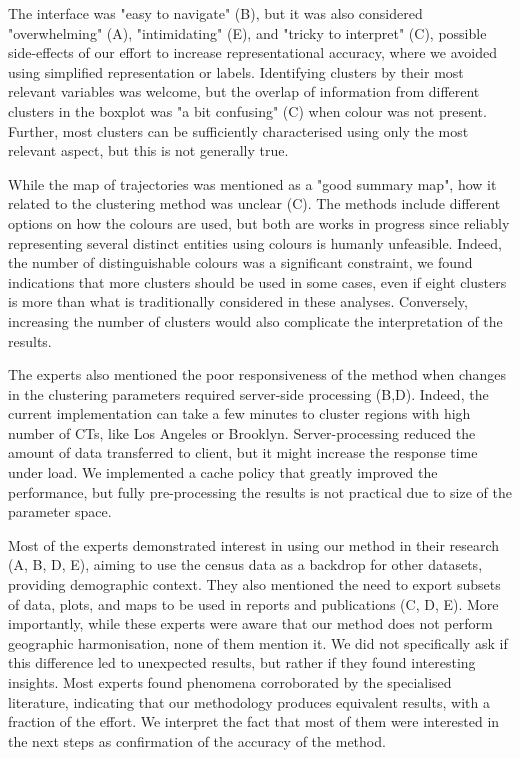 The interface was "easy to navigate" (B), but it was also considered
"overwhelming" (A), "intimidating" (E), and "tricky to interpret" (C), possible
side-effects of our effort to increase  representational accuracy, where we
avoided using simplified representation or labels. Identifying clusters by their
most relevant variables was welcome, but the overlap of information from
different clusters in the boxplot was "a bit confusing" (C) when colour was not
present. Further, most clusters can be sufficiently characterised using only the
most relevant aspect, but this is not generally true. 


While the map of trajectories was mentioned as a "good summary map", how it
related to the clustering method was unclear (C). The methods include different
options on how the colours are used, but both are works in progress since reliably
representing several distinct entities using colours is humanly unfeasible.
Indeed, the number of distinguishable colours was a significant constraint, we
found indications that more clusters should be used in some cases, even if eight
clusters is more than what is traditionally considered in these analyses.
Conversely, increasing the number of clusters would also complicate the
interpretation of the results.


The experts also mentioned the poor responsiveness of the method when changes in
the clustering parameters required server-side processing (B,D). Indeed, the
current implementation can take a few minutes to cluster regions with high
number of CTs, like Los Angeles or Brooklyn. Server-processing reduced the
amount of data transferred to client, but it might increase the response time
under load. We implemented a cache policy that greatly improved the performance,
but fully pre-processing the results is not practical due to size of the
parameter space.

Most of the experts demonstrated interest in using our method in their research
(A, B, D, E), aiming to use the census data as a backdrop for other datasets,
providing demographic context. They also mentioned the need to export subsets of
data, plots, and maps to be used in reports and publications (C, D, E). More
importantly, while these experts were aware that our method does not perform
geographic harmonisation, none of them mention it. We did not specifically ask
if this difference led to unexpected results, but rather if they found
interesting insights. Most experts found phenomena corroborated by the
specialised literature, indicating that our methodology produces equivalent
results, with a fraction of the effort. We interpret the fact that most of them
were interested in the next steps as confirmation of the accuracy of the method.